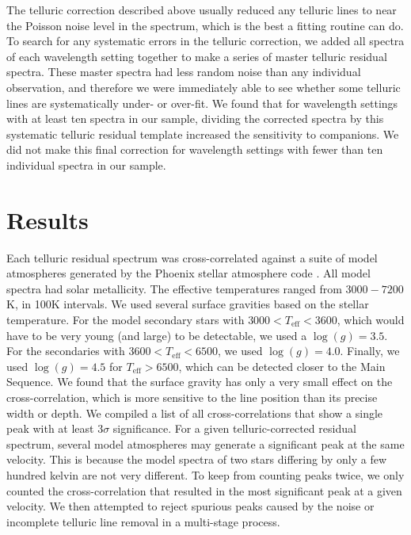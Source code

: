 The telluric correction described above usually reduced any telluric
lines to near the Poisson noise level in the spectrum, which is the best a
fitting routine can do. To search for any systematic errors in the
telluric correction, we added all spectra of each wavelength setting
together to make a series of master telluric residual spectra. These
master spectra had less random noise than any individual observation, and therefore we were
immediately able to see whether some telluric lines are systematically
under- or over-fit. We found that for wavelength settings with at
least ten spectra in our sample, dividing the corrected spectra by
this systematic telluric residual template increased the sensitivity
to companions. We did not make this final correction for
wavelength settings with fewer than ten individual spectra in our sample.



\section{Results}
\label{paper1_sec:results}
Each telluric residual spectrum was cross-correlated against a suite of model atmospheres
generated by the Phoenix stellar atmosphere code \citep{Hauschildt1999}. All model spectra had solar metallicity. The effective
temperatures ranged from $3000-7200$ K, in 100K intervals. We used
several surface gravities based on the stellar temperature. For the
model secondary stars with $3000 < T_\mathrm{eff} < 3600$, which would
have to be very young (and large) to be detectable, we used a $\log (g) = 3.5$. For the secondaries with
$3600 < T_\mathrm{eff} < 6500$, we used $\log (g) = 4.0$. Finally, we used
$\log (g) = 4.5$ for $T_\mathrm{eff} > 6500$, which can be detected
closer to the Main Sequence. We found that the surface gravity has only a very small
effect on the cross-correlation, which is more sensitive to the line
position than its precise width or depth. We
compiled a list of all cross-correlations that show a single peak with
at least $3\sigma$ significance. For a given telluric-corrected residual
spectrum, several model atmospheres may generate a significant peak at
the same velocity. This is because the model spectra of two stars
differing by only a few hundred kelvin are not very different. To keep from
counting peaks twice, we only counted the cross-correlation that
resulted in the most significant peak at a given velocity. We then attempted to
reject spurious peaks caused by the noise or incomplete telluric line
removal in a multi-stage process.

